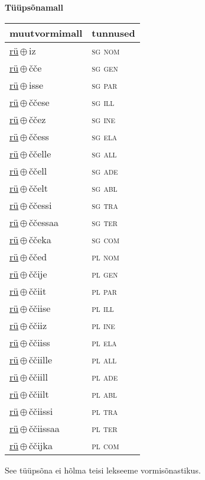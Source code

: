 

\vspace{3.5em}
\noindent \begin{minipage}{\textwidth}
\noindent \textbf{Tüüpsõnamall \,}\\

\begin{sideways}
\begin{tabular}{l l}
muutvormimall & tunnused \\
\hline
\underline{rü}\,$\oplus$\,iz & \textsc{ sg nom } \\
\underline{rü}\,$\oplus$\,čče & \textsc{ sg gen } \\
\underline{rü}\,$\oplus$\,isse & \textsc{ sg par } \\
\underline{rü}\,$\oplus$\,ččese & \textsc{ sg ill } \\
\underline{rü}\,$\oplus$\,ččez & \textsc{ sg ine } \\
\underline{rü}\,$\oplus$\,ččess & \textsc{ sg ela } \\
\underline{rü}\,$\oplus$\,ččelle & \textsc{ sg all } \\
\underline{rü}\,$\oplus$\,ččell & \textsc{ sg ade } \\
\underline{rü}\,$\oplus$\,ččelt & \textsc{ sg abl } \\
\underline{rü}\,$\oplus$\,ččessi & \textsc{ sg tra } \\
\underline{rü}\,$\oplus$\,ččessaa & \textsc{ sg ter } \\
\underline{rü}\,$\oplus$\,ččeka & \textsc{ sg com } \\
\underline{rü}\,$\oplus$\,ččed & \textsc{ pl nom } \\
\underline{rü}\,$\oplus$\,ččije & \textsc{ pl gen } \\
\underline{rü}\,$\oplus$\,ččiit & \textsc{ pl par } \\
\underline{rü}\,$\oplus$\,ččiise & \textsc{ pl ill } \\
\underline{rü}\,$\oplus$\,ččiiz & \textsc{ pl ine } \\
\underline{rü}\,$\oplus$\,ččiiss & \textsc{ pl ela } \\
\underline{rü}\,$\oplus$\,ččiille & \textsc{ pl all } \\
\underline{rü}\,$\oplus$\,ččiill & \textsc{ pl ade } \\
\underline{rü}\,$\oplus$\,ččiilt & \textsc{ pl abl } \\
\underline{rü}\,$\oplus$\,ččiissi & \textsc{ pl tra } \\
\underline{rü}\,$\oplus$\,ččiissaa & \textsc{ pl ter } \\
\underline{rü}\,$\oplus$\,ččijka & \textsc{ pl com } \\
\end{tabular}
\end{sideways}
\label{tab:tüüpsõnamall-rüiz}

\end{minipage}

 
\vspace{1em}
\noindent See tüüpsõna ei hõlma teisi lekseeme vormi\-sõnastikus.
